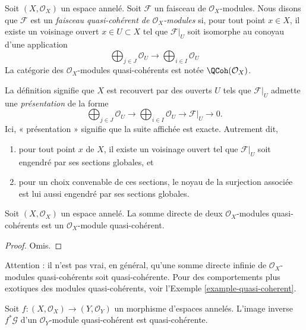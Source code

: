 \begin{definition}
\label{definition-quasi-coherent}
Soit $(X, \mathcal{O}_X)$ un espace annelé. Soit $\mathcal{F}$ un faisceau de
$\mathcal{O}_X$-modules. Nous disons que $\mathcal{F}$ est un
{\it faisceau quasi-cohérent de $\mathcal{O}_X$-modules} si, pour tout point
$x \in X$, il existe un voisinage ouvert $x\in U \subset X$ tel que
$\mathcal{F}|_U$ soit isomorphe au conoyau d'une application
$$
\bigoplus\nolimits_{j \in J}
\mathcal{O}_U
\longrightarrow
\bigoplus\nolimits_{i \in I}
\mathcal{O}_U
$$
La catégorie des $\mathcal{O}_X$-modules quasi-cohérents est notée
$\QCoh(\mathcal{O}_X)$.
\end{definition}

\noindent
La définition signifie que $X$ est recouvert par des ouverts $U$ tels que
$\mathcal{F}|_U$ admette une {\it présentation} de la forme
$$
\bigoplus\nolimits_{j \in J}
\mathcal{O}_U
\longrightarrow
\bigoplus\nolimits_{i \in I}
\mathcal{O}_U
\longrightarrow
\mathcal{F}|_U
\longrightarrow
0.
$$
Ici, « présentation » signifie que la suite affichée est exacte. Autrement dit,
\begin{enumerate}
\item pour tout point $x$ de $X$, il existe un voisinage ouvert tel que
$\mathcal{F}|_U$ soit engendré par ses sections globales, et
\item pour un choix convenable de ces sections, le noyau de la surjection
associée est lui aussi engendré par ses sections globales.
\end{enumerate}

\begin{lemma}
\label{lemma-direct-sum-quasi-coherent}
Soit $(X, \mathcal{O}_X)$ un espace annelé. La somme directe de deux
$\mathcal{O}_X$-modules quasi-cohérents est un $\mathcal{O}_X$-module
quasi-cohérent.
\end{lemma}

\begin{proof}
Omis.
\end{proof}

\begin{remark}
\label{remark-infinite-direct-sum-quasi-coherent-not}
Attention : il n'est pas vrai, en général, qu'une somme directe infinie de
$\mathcal{O}_X$-modules quasi-cohérents soit quasi-cohérente. Pour des
comportements plus exotiques des modules quasi-cohérents, voir l'Exemple
\ref{example-quasi-coherent}.
\end{remark}

\begin{lemma}
\label{lemma-pullback-quasi-coherent}
Soit $f : (X, \mathcal{O}_X) \to (Y, \mathcal{O}_Y)$ un morphisme d'espaces
annelés. L'image inverse $f^*\mathcal{G}$ d'un $\mathcal{O}_Y$-module
quasi-cohérent est quasi-cohérente.
\end{lemma}

